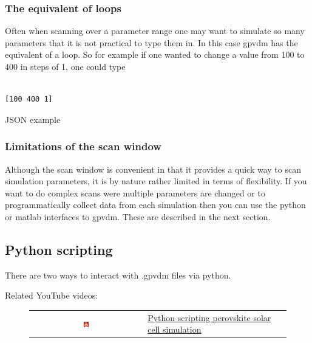 \subsubsection{The equivalent of loops}
Often when scanning over a parameter range one may want to simulate so many parameters that it is not practical to type them in.  In this case gpvdm has the equivalent of a loop. So for example if one wanted to change a value from 100 to 400 in steps of 1, one could type

\begin{listing}[H]
\begin{verbatim}

[100 400 1]

\end{verbatim}
\caption{JSON example} 
\label{json-example}
\end{listing}

\subsubsection{Limitations of the scan window}
Although the scan window is convenient in that it provides a quick way to scan simulation parameters, it is by nature rather limited in terms of flexibility. If you want to do complex scans were multiple parameters are changed or to programmatically collect data from each simulation then you can use the python or matlab interfaces to gpvdm.  These are described in the next section.

\newpage
\subsection{Python scripting}
There are two ways to interact with .gpvdm files via python.

Related YouTube videos:
\begin{figure}[H]

\begin{tabular}{ c l }

\includegraphics[width=0.05\textwidth]{./images/youtube.png}

&
\href{https://www.youtube.com/watch?v=vyeAzxBZjMg}{Python scripting perovskite solar cell simulation}

\end{tabular}
\end{figure}


